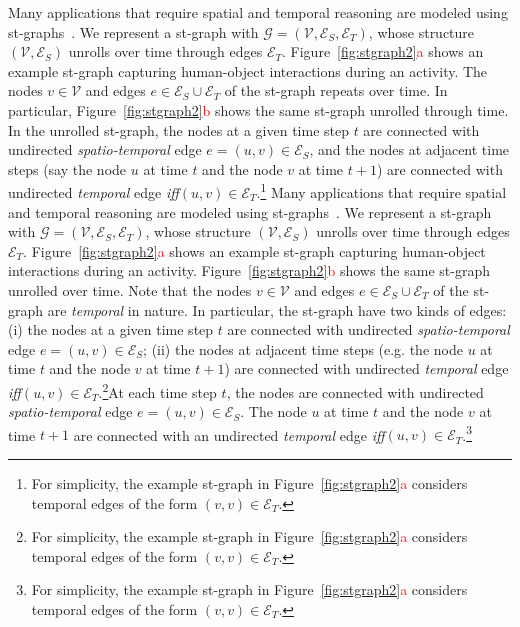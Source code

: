 \documentclass[10pt,twocolumn,letterpaper]{article}
\newcommand{\mcal}[1]{\mathcal{#1}}
\newcommand{\rc}[1]{\textcolor{red}{#1}}
\begin{document}
Many applications that require spatial and temporal reasoning are modeled using st-graphs~\cite{Brendel11,Douillard11,Koppula15,Zhang14b,Jain15}.
We represent a st-graph with $\mathcal{G}=(\mathcal{V},\mathcal{E}_S,\mathcal{E}_T)$,  whose structure $(\mathcal{V},\mathcal{E}_S)$ unrolls over time through edges $\mathcal{E}_T$. Figure~\ref{fig:stgraph2}\rc{a} shows an example st-graph capturing human-object interactions during an activity.  The nodes $v \in \mcal{V}$ and edges $e \in \mcal{E}_S\cup \mcal{E}_T$ of the st-graph repeats over time. In particular, Figure~\ref{fig:stgraph2}\rc{b} shows the same st-graph unrolled through time. In the unrolled st-graph, the nodes at a given time step $t$ are connected with undirected \textit{spatio-temporal} edge $e=(u,v) \in \mcal{E}_S$, and the nodes at adjacent time steps (say the node $u$ at time $t$ and the node $v$ at time $t+1$)  are connected with  undirected \textit{temporal} edge \textit{iff}$(u,v) \in \mcal{E}_T$.\footnote{For simplicity, the example st-graph in Figure~\ref{fig:stgraph2}\rc{a} considers temporal edges of the form  $(v,v) \in \mcal{E}_T$.}\iffalse
Many applications that require spatial and temporal reasoning are modeled using st-graphs~\cite{Brendel11,Douillard11,Koppula15,Zhang14b,Jain15}.
We represent a st-graph with $\mathcal{G}=(\mathcal{V},\mathcal{E}_S,\mathcal{E}_T)$,  whose structure $(\mathcal{V},\mathcal{E}_S)$ unrolls over time through edges $\mathcal{E}_T$. Figure~\ref{fig:stgraph2}\rc{a} shows an example st-graph capturing human-object interactions during an activity.  Figure~\ref{fig:stgraph2}\rc{b} shows the same st-graph unrolled over time. Note that the nodes $v \in \mcal{V}$ and edges $e \in \mcal{E}_S\cup \mcal{E}_T$ of the st-graph are \textit{temporal} in nature. In particular, the st-graph have two kinds of edges: (i) the nodes at a given time step $t$ are connected with undirected \textit{spatio-temporal} edge $e=(u,v) \in \mcal{E}_S$; (ii) the nodes at adjacent time steps (e.g. the node $u$ at time $t$ and the node $v$ at time $t+1$)  are connected with  undirected \textit{temporal} edge \textit{iff}$(u,v) \in \mcal{E}_T$.\footnote{For simplicity, the example st-graph in Figure~\ref{fig:stgraph2}\rc{a} considers temporal edges of the form  $(v,v) \in \mcal{E}_T$.}At each time step $t$, the nodes are connected with undirected \textit{spatio-temporal} edge $e=(u,v) \in \mcal{E}_S$. The node $u$ at time $t$ and the node $v$ at time $t+1$ are connected with an undirected \textit{temporal} edge \textit{iff}$(u,v) \in \mcal{E}_T$.\footnote{For simplicity, the example st-graph in Figure~\ref{fig:stgraph2}\rc{a} considers temporal edges of the form  $(v,v) \in \mcal{E}_T$.}%
\end{document}

